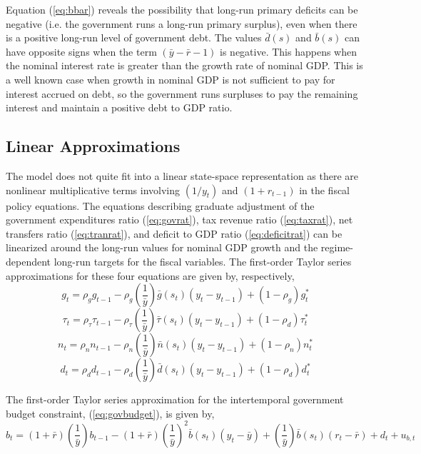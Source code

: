 \documentclass[11pt]{article}
\newcommand{\beq}{\begin{equation}}
\newcommand{\eeq}{\end{equation}}
\begin{document}
Equation (\ref{eq:bbar}) reveals the possibility that long-run primary deficits can be negative (i.e. the government runs a long-run primary surplus), even when there is a positive long-run level of government debt.  The values $\bar{d}(s)$ and $\bar{b}(s)$ can have opposite signs when the term $\left(\bar{y}-\bar{r}-1\right)$ is negative.  This happens when the nominal interest rate is greater than the growth rate of nominal GDP.  This is a well known case when growth in nominal GDP is not sufficient to pay for interest accrued on debt, so the government runs surpluses to pay the remaining interest and maintain a positive debt to GDP ratio.

\subsection{Linear Approximations}

The model does not quite fit into a linear state-space representation as there are nonlinear multiplicative terms involving $(1/y_t)$ and $(1+r_{t-1})$ in the fiscal policy equations.  The equations describing graduate adjustment of the government expenditures ratio (\ref{eq:govrat}), tax revenue ratio (\ref{eq:taxrat}), net transfers ratio (\ref{eq:tranrat}), and deficit to GDP ratio (\ref{eq:deficitrat}) can be linearized around the long-run values for nominal GDP growth and the regime-dependent long-run targets for the fiscal variables.  The first-order Taylor series approximations for these four equations are given by, respectively,
\beq \label{eq:govlin} g_t = \rho_g g_{t-1} - \rho_g \left(\frac{1}{\bar{y}}\right) \bar{g}(s_t) (y_t - y_{t-1}) + (1-\rho_g)g_t^* \eeq
\beq \label{eq:taxlin} \tau_t = \rho_\tau \tau_{t-1} - \rho_\tau \left(\frac{1}{\bar{y}}\right) \bar{\tau}(s_t) (y_t - y_{t-1}) + (1-\rho_d)\tau_t^* \eeq
\beq \label{eq:tranlin} n_t = \rho_n  n_{t-1} - \rho_n \left(\frac{1}{\bar{y}}\right) \bar{n}(s_t) (y_t - y_{t-1}) + (1-\rho_n)n_t^* \eeq
\beq \label{eq:deficitlin} d_t = \rho_d d_{t-1} - \rho_d \left(\frac{1}{\bar{y}}\right) \bar{d}(s_t) (y_t - y_{t-1}) + (1-\rho_d)d_t^* \eeq

The first-order Taylor series approximation for the intertemporal government budget constraint, (\ref{eq:govbudget}), is given by,
\beq \label{eq:lingovbudget} b_t = (1+\bar{r}) \left( \frac{1}{\bar{y}} \right) b_{t-1} - (1+\bar{r}) \left( \frac{1}{\bar{y}} \right)^2 \bar{b}(s_t) (y_t - \bar{y}) + \left( \frac{1}{\bar{y}} \right) \bar{b}(s_t) (r_t - \bar{r}) + d_t + u_{b,t} \eeq
\end{document}
